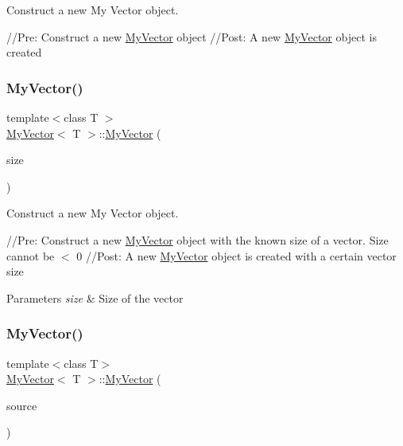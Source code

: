 Construct a new My Vector object. 

//\+Pre\+: Construct a new \mbox{\hyperlink{class_my_vector}{My\+Vector}} object //\+Post\+: A new \mbox{\hyperlink{class_my_vector}{My\+Vector}} object is created \mbox{\label{class_my_vector_a9f780e2c6c6f35610a656b64395c6d1b}} 
\subsubsection{\texorpdfstring{MyVector()}{MyVector()}\hspace{0.1cm}{\footnotesize\ttfamily [2/3]}}
{\footnotesize\ttfamily template$<$class T $>$ \\
\mbox{\hyperlink{class_my_vector}{My\+Vector}}$<$ T $>$\+::\mbox{\hyperlink{class_my_vector}{My\+Vector}} (\begin{DoxyParamCaption}\item[{int}]{size }\end{DoxyParamCaption})}



Construct a new My Vector object. 

//\+Pre\+: Construct a new \mbox{\hyperlink{class_my_vector}{My\+Vector}} object with the known size of a vector. Size cannot be $<$ 0 //\+Post\+: A new \mbox{\hyperlink{class_my_vector}{My\+Vector}} object is created with a certain vector size 
\begin{DoxyParams}{Parameters}
{\em size} & Size of the vector \\
\hline
\end{DoxyParams}
\mbox{\label{class_my_vector_aaf93995f4a267cc279867c10cfbef623}} 
\subsubsection{\texorpdfstring{MyVector()}{MyVector()}\hspace{0.1cm}{\footnotesize\ttfamily [3/3]}}
{\footnotesize\ttfamily template$<$class T$>$ \\
\mbox{\hyperlink{class_my_vector}{My\+Vector}}$<$ T $>$\+::\mbox{\hyperlink{class_my_vector}{My\+Vector}} (\begin{DoxyParamCaption}\item[{const \mbox{\hyperlink{class_my_vector}{My\+Vector}}$<$ T $>$ \&}]{source }\end{DoxyParamCaption})}



